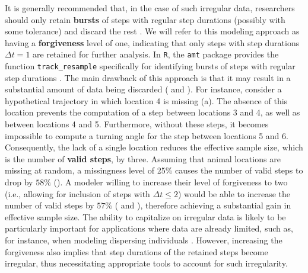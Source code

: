 \documentclass[../FinalThesis.tex]{subfiles}
\begin{document}
It is generally recommended that, in the case of such irregular data,
researchers should only retain \textbf{bursts} of steps with regular
step durations (possibly with some tolerance) and discard the rest
\citep{Thurfjell.2014}. We will refer to this modeling approach as having a
\textbf{forgiveness} level of one, indicating that only steps with
step durations $\Delta t = 1$ are retained for further analysis. In \texttt{R},
the \texttt{amt} package provides the function \texttt{track\_resample}
specifically for identifying bursts of steps with regular step durations
\citep{Signer.2019}. The main drawback of this approach is that it may result in
a substantial amount of data being discarded ( and
). For instance, consider a hypothetical trajectory in which
location 4 is missing (a). The absence of this location prevents
the computation of a step between locations 3 and 4, as well as between
locations 4 and 5. Furthermore, without these steps, it becomes impossible to
compute a turning angle for the step between locations 5 and 6. Consequently,
the lack of a single location reduces the effective sample size, which is the
number of \textbf{valid steps}, by three. Assuming that animal locations are
missing at random, a missingness level of 25\% causes the number of valid steps
to drop by $58\%$ (). A modeler willing to increase their
level of forgiveness to two (i.e., allowing for inclusion of steps with $\Delta
t \leq 2$) would be able to increase the number of valid steps by $57\%$
( and ), therefore achieving a substantial
gain in effective sample size. The ability to capitalize on irregular data is
likely to be particularly important for applications where data are already
limited, such as, for instance, when modeling dispersing individuals
\citep{Rudnick.2012, Fattebert.2015, Cozzi.2020}. However, increasing the
forgiveness also implies that step durations of the retained steps become
irregular, thus necessitating appropriate tools to account for such
irregularity.
\end{document}
